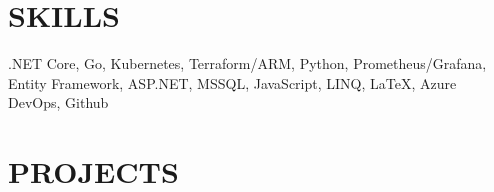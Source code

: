 \documentclass[margin, 10pt, hidelinks]{res} %
\newcommand{\emphasize}{\large} %
\begin{document}
\begin{resume}


\section{SKILLS}

.NET Core, Go, Kubernetes, Terraform/ARM, Python, Prometheus/Grafana, Entity Framework, ASP.NET, MSSQL, JavaScript, LINQ, LaTeX,
Azure DevOps, Github

\section{PROJECTS}


\end{resume}
\end{document}
